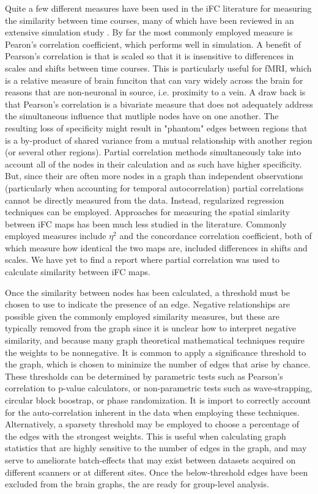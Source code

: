 Quite a few different measures have been used in the iFC literature for measuring the similarity between time courses, many of which have been reviewed in an extensive simulation study \cite{smith2010}. By far the most commonly employed measure is Pearon's correlation coefficient, which performs well in simulation. A benefit of Pearson's correlation is that is scaled so that it is insensitive to differences in scales and shifts between time courses. This is particularly useful for fMRI, which is a relative measure of brain funciton that can vary widely across the brain for reasons that are non-neuronal in source, i.e. proximity to a vein. A draw back is that Pearson's correlation is a bivariate measure that does not adequately address the simultaneous influence that mutliple nodes have on one another. The resulting loss of specificity might result in "phantom" edges between regions that is a by-product of shared variance from a mutual relationship with another region (or several other regions). Partial correlation methods simultaneously take into account all of the nodes in their calculation and as such have higher specificity. But, since their are often more nodes in a graph than independent observations (particularly when accounting for temporal autocorrelation) partial correlations cannot be directly measured from the data. Instead, regularized regression techniques can be employed. Approaches for measuring the spatial simlarity between iFC maps has been much less studied in the literature. Commonly employed measures include $\eta^2$ and the concordance correlation coefficient, both of which measure how identical the two maps are, included differences in shifts and scales. We have yet to find a report where partial correlation was used to calculate similarity between iFC maps.

Once the similarity between nodes has been calculated, a threshold must be chosen to use to indicate the presence of an edge. Negative relationships are possible given the commonly employed similarity measures, but these are typically removed from the graph since it is unclear how to interpret negative similarity, and because many graph theoretical mathematical techniques require the weights to be nonnegative. It is common to apply a significance threshold to the graph, which is chosen to minimize the number of edges that arise by chance. These thresholds can be determined by parametric tests such as Pearson's correlation to p-value calculators, or non-parametric tests such as wave-strapping, circular block boostrap, or phase randomization. It is import to correctly account for the auto-correlation inherent in the data when employing these techniques. Alternatively, a sparsety threshold may be employed to choose a percentage of the edges with the strongest weights. This is useful when calculating graph statistics that are highly sensitive to the number of edges in the graph, and may serve to ameliorate batch-effects that may exist between datasets acquired on different scanners or at different sites. Once the below-threshold edges have been excluded from the brain graphs, the are ready for group-level analysis. 

